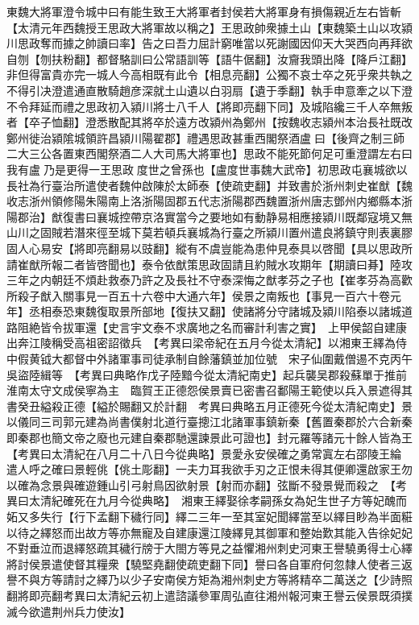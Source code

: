 東魏大將軍澄令城中曰有能生致王大將軍者封侯若大將軍身有損傷親近左右皆斬【太清元年西魏授王思政大將軍故以稱之】王思政帥衆據土山【東魏築土山以攻潁川思政奪而據之帥讀曰率】告之曰吾力屈計窮唯當以死謝國因仰天大哭西向再拜欲自刎【刎扶粉翻】都督駱訓曰公常語訓等【語牛倨翻】汝齎我頭出降【降戶江翻】非但得富貴亦完一城人今高相既有此令【相息亮翻】公獨不哀士卒之死乎衆共執之不得引决澄遣通直散騎趙彦深就土山遺以白羽扇【遺于季翻】執手申意牽之以下澄不令拜延而禮之思政初入潁川將士八千人【將即亮翻下同】及城陷纔三千人卒無叛者【卒子恤翻】澄悉散配其將卒於遠方改潁州為鄭州【按魏收志潁州本治長社既改鄭州徙治潁隂城領許昌潁川陽翟郡】禮遇思政甚重西閣祭酒盧曰【後齊之制三師二大三公各置東西閣祭酒二人大司馬大將軍也】思政不能死節何足可重澄謂左右曰我有盧乃是更得一王思政度世之曾孫也【盧度世事魏大武帝】初思政屯襄城欲以長社為行臺治所遣使者魏仲啟陳於太師泰【使疏吏翻】并致書於浙州刺史崔猷【魏收志浙州領修陽朱陽南上洛浙陽固郡五代志浙陽郡西魏置浙州唐志鄧州内鄉縣本浙陽郡治】猷復書曰襄城控帶京洛實當今之要地如有動静易相應接潁川既鄰寇境又無山川之固賊若潛來徑至城下莫若頓兵襄城為行臺之所潁川置州遣良將鎮守則表裏膠固人心易安【將即亮翻易以豉翻】縱有不虞豈能為患仲見泰具以啓聞【具以思政所請崔猷所報二者皆啓聞也】泰令依猷策思政固請且約賊水攻期年【期讀曰朞】陸攻三年之内朝廷不煩赴救泰乃許之及長社不守泰深悔之猷孝芬之子也【崔孝芬為高歡所殺子猷入關事見一百五十六卷中大通六年】侯景之南叛也【事見一百六十卷元年】丞相泰恐東魏復取景所部地【復扶又翻】使諸將分守諸城及潁川陷泰以諸城道路阻絶皆令拔軍還【史言宇文泰不求廣地之名而審計利害之實】　上甲侯韶自建康出奔江陵稱受高祖密詔徵兵　【考異曰梁帝紀在五月今從太清紀】以湘東王繹為侍中假黄钺大都督中外諸軍事司徒承制自餘藩鎮並加位號　宋子仙圍戴僧逷不克丙午吳盜陸緝等　【考異曰典略作戊子陸黯今從太清紀南史】起兵襲吴郡殺蘇單于推前淮南太守文成侯寧為主　臨賀王正德怨侯景賣已密書召鄱陽王範使以兵入景遮得其書癸丑縊殺正德【縊於賜翻又於計翻　考異曰典略五月正德死今從太清紀南史】景以儀同三司郭元建為尚書僕射北道行臺摠江北諸軍事鎮新秦【舊置秦郡於六合新秦即秦郡也簡文帝之廢也元建自秦郡馳還諫景此可證也】封元羅等諸元十餘人皆為王　【考異曰太清紀在八月二十八日今從典略】景愛永安侯確之勇常寘左右邵陵王綸遣人呼之確曰景輕佻【佻土彫翻】一夫力耳我欲手刃之正恨未得其便卿還啟家王勿以確為念景與確遊鍾山引弓射鳥因欲射景【射而亦翻】弦斷不發景覺而殺之　【考異曰太清紀確死在九月今從典略】　湘東王繹娶徐孝嗣孫女為妃生世子方等妃醜而妬又多失行【行下孟翻下穢行同】繹二三年一至其室妃聞繹當至以繹目眇為半面糚以待之繹怒而出故方等亦無寵及自建康還江陵繹見其御軍和整始歎其能入告徐妃妃不對垂泣而退繹怒疏其穢行牓于大閤方等見之益懼湘州刺史河東王譽驍勇得士心繹將討侯景遣使督其糧衆【驍堅堯翻使疏吏翻下同】譽曰各自軍府何忽隸人使者三返譽不與方等請討之繹乃以少子安南侯方矩為湘州刺史方等將精卒二萬送之【少詩照翻將即亮翻考異曰太清紀云初上遣諮議參軍周弘直往湘州報河東王譽云侯景既須撲滅今欲遣荆州兵力使汝】

